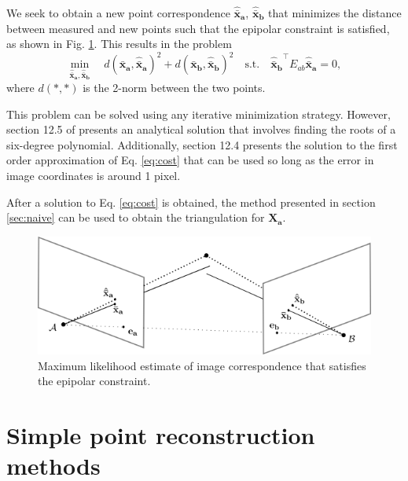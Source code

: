 	We seek to obtain a new point correspondence $\mathbf{\hat{\bar{x}}_a}$, $\mathbf{\hat{\bar{x}}_b}$ that minimizes the distance between measured and new points such that the epipolar constraint is satisfied, as shown in Fig. \ref{fig:noise_corr}. This results in the problem
	\begin{equation}
	\min_{\mathbf{\hat{\bar{x}}_a},\mathbf{\hat{\bar{x}}_b}} \quad d(\mathbf{\bar{x}_a}, \mathbf{\hat{\bar{x}}_a})^2 + d(\mathbf{\bar{x}_b}, \mathbf{\hat{\bar{x}}_b})^2 \quad \text{s.t.} \quad \mathbf{\hat{\bar{x}}_b}^\top E_{ab} \mathbf{\hat{\bar{x}}_a} = 0,
	\label{eq:cost}
	\end{equation}
	where $d(*,*)$ is the 2-norm between the two points. 
	
	This problem can be solved using any iterative minimization strategy. However, section 12.5 of \cite{Hartley2004} presents an analytical solution that involves finding the roots of a six-degree polynomial. Additionally, section 12.4 presents the solution to the first order approximation of Eq. \ref{eq:cost} that can be used so long as the error in image coordinates is around 1 pixel.
	
	After a solution to Eq. \ref{eq:cost} is obtained, the method presented in section \ref{sec:naive} can be used to obtain the triangulation for $\mathbf{X_a}$.
	
	\begin{figure}
		\includegraphics[width=\linewidth]{chap8_scene_reconstruction/figures/epipolar_noise_corr}
		\caption{Maximum likelihood estimate of image correspondence that satisfies the epipolar constraint.}
		\label{fig:noise_corr}
	\end{figure}



\section{Simple point reconstruction methods}
\label{sec:point_reconstruction}

